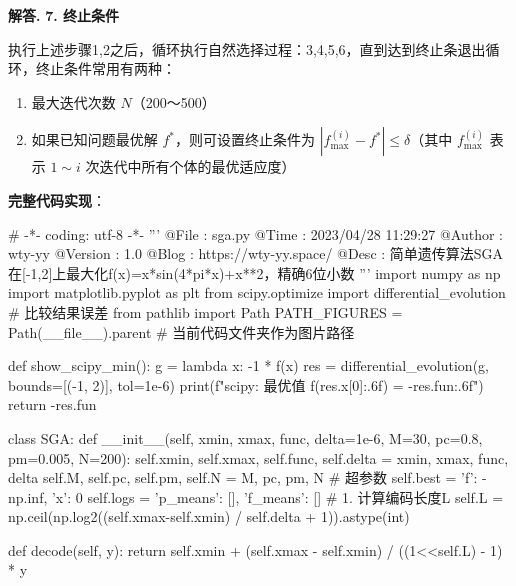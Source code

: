 \documentclass[12pt, a4paper, oneside]{ctexart}
\newenvironment{solution}[1][]{\par\noindent\textbf{#1解答. }}{\smallskip\par}  %
\begin{document}
\begin{solution}
\textbf{7. 终止条件}

执行上述步骤1,2之后，循环执行自然选择过程：3,4,5,6，直到达到终止条退出循环，终止条件常用有两种：

\begin{enumerate}
\def\labelenumi{\arabic{enumi}.}
\item
  最大迭代次数 \(N\)（200～500）
\item
  如果已知问题最优解 \(f^*\)，则可设置终止条件为
  \(|f^{(i)}_{\max}-f^*|\leqslant \delta\)（其中 \(f^{(i)}_{\max}\) 表示
  \(1\sim i\) 次迭代中所有个体的最优适应度）
\end{enumerate}
\textbf{完整代码实现}：
\begin{pythoncode}
# -*- coding: utf-8 -*-
'''
@File    : sga.py
@Time    : 2023/04/28 11:29:27
@Author  : wty-yy
@Version : 1.0
@Blog    : https://wty-yy.space/
@Desc    : 简单遗传算法SGA在[-1,2]上最大化f(x)=x*sin(4*pi*x)+x**2，精确6位小数
'''
import numpy as np
import matplotlib.pyplot as plt
from scipy.optimize import differential_evolution  # 比较结果误差
from pathlib import Path
PATH_FIGURES = Path(__file__).parent  # 当前代码文件夹作为图片路径

def show_scipy_min():
    g = lambda x: -1 * f(x)
    res = differential_evolution(g, bounds=[(-1, 2)], tol=1e-6)
    print(f"scipy: 最优值 f({res.x[0]:.6f}) = {-res.fun:.6f}")
    return -res.fun

class SGA:
    def __init__(self, xmin, xmax, func, delta=1e-6, M=30, pc=0.8, pm=0.005, N=200):
        self.xmin, self.xmax, self.func, self.delta = xmin, xmax, func, delta
        self.M, self.pc, self.pm, self.N = M, pc, pm, N  # 超参数
        self.best = {'f': -np.inf, 'x': 0}
        self.logs = {'p_means': [], 'f_means': []}
        # 1. 计算编码长度L
        self.L = np.ceil(np.log2((self.xmax-self.xmin) / self.delta + 1)).astype(int)

    def decode(self, y):
        return self.xmin + (self.xmax - self.xmin) / ((1<<self.L) - 1) * y
    

\end{pythoncode}
\end{solution}
\end{document}

